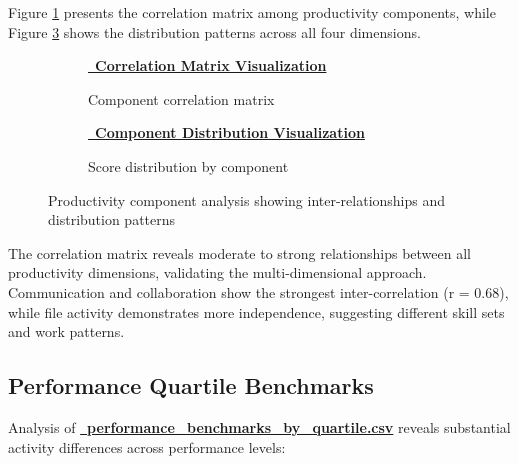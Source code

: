 \documentclass[12pt,a4paper]{article}
\newcommand{\styledimagelink}[2]{\textcolor{accentBlue}{\href{#1}{{\normalsize\faImage}\, \textbf{#2}}}}
\begin{document}
Figure \ref{fig:correlation_matrix} presents the correlation matrix among productivity components, while Figure \ref{fig:component_distribution} shows the distribution patterns across all four dimensions.

\begin{figure}[H]
\centering
\begin{subfigure}{0.48\textwidth}
    \styledimagelink{https://fixysaskihumorizijuv.supabase.co/storage/v1/object/public/research-files/63aa7832-a972-4cd0-83a2-1dd0fd19568f-correlation_matrix.png?download=}{Correlation Matrix Visualization}
    \caption{Component correlation matrix}
    \label{fig:correlation_matrix}
\end{subfigure}
\hfill
\begin{subfigure}{0.48\textwidth}
    \styledimagelink{https://fixysaskihumorizijuv.supabase.co/storage/v1/object/public/research-files/4c449654-08e5-41be-b2fb-dc65254a4e31-component_distribution.png?download=}{Component Distribution Visualization}
    \caption{Score distribution by component}
    \label{fig:component_distribution}
\end{subfigure}
\caption{Productivity component analysis showing inter-relationships and distribution patterns}
\end{figure}

The correlation matrix reveals moderate to strong relationships between all productivity dimensions, validating the multi-dimensional approach. Communication and collaboration show the strongest inter-correlation (r = 0.68), while file activity demonstrates more independence, suggesting different skill sets and work patterns.

\subsection{Performance Quartile Benchmarks}

Analysis of \textcolor{primaryGold}{\href{https://fixysaskihumorizijuv.supabase.co/storage/v1/object/public/research-files/e3bd4059-8cc7-437f-8aab-a2ed0700120e-performance_benchmarks_by_quartile.csv?download=}{{\normalsize\faChartArea}\, \textbf{performance\_benchmarks\_by\_quartile.csv}}} reveals substantial activity differences across performance levels:
\end{document}
